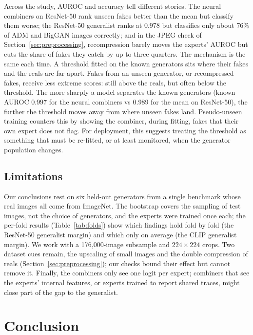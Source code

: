 \documentclass[10pt,a4paper]{article}
\begin{document}
Across the study, AUROC and accuracy tell different stories. The neural combiners on ResNet-50 rank unseen fakes better than the mean but classify them worse; the ResNet-50 generalist ranks at 0.978 but classifies only about 76\% of ADM and BigGAN images correctly; and in the JPEG check of Section~\ref{sec:preprocessing}, recompression barely moves the experts' AUROC but cuts the share of fakes they catch by up to three quarters. The mechanism is the same each time. A threshold fitted on the known generators sits where their fakes and the reals are far apart. Fakes from an unseen generator, or recompressed fakes, receive less extreme scores: still above the reals, but often below the threshold. The more sharply a model separates the known generators (known AUROC 0.997 for the neural combiners vs 0.989 for the mean on ResNet-50), the further the threshold moves away from where unseen fakes land. Pseudo-unseen training counters this by showing the combiner, during fitting, fakes that their own expert does not flag. For deployment, this suggests treating the threshold as something that must be re-fitted, or at least monitored, when the generator population changes.

\subsection{Limitations}

Our conclusions rest on six held-out generators from a single benchmark whose real images all come from ImageNet. The bootstrap covers the sampling of test images, not the choice of generators, and the experts were trained once each; the per-fold results (Table~\ref{tab:folds}) show which findings hold fold by fold (the ResNet-50 generalist margin) and which only on average (the CLIP generalist margin). We work with a 176,000-image subsample and $224\times224$ crops. Two dataset cues remain, the upscaling of small images and the double compression of reals (Section~\ref{sec:preprocessing}); our checks bound their effect but cannot remove it. Finally, the combiners only see one logit per expert; combiners that see the experts' internal features, or experts trained to report shared traces, might close part of the gap to the generalist.

\section{Conclusion}\label{sec:conclusion}
\end{document}

